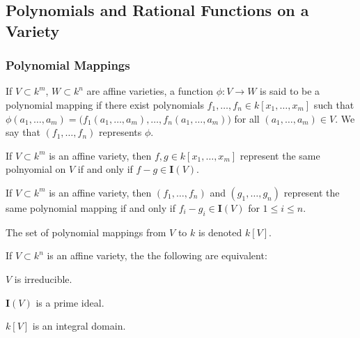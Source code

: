\documentclass[crop=false,class=book,oneside]{standalone}
\begin{document}
\subsection{Polynomials and Rational Functions on a Variety}
\subsubsection{Polynomial Mappings}
\begin{definition}
If $V\subset k^m$, $W\subset k^n$ are affine varieties, a function $\phi:V\rightarrow W$ is said to be a polynomial mapping if there exist polynomials $f_1,\hdots, f_n\in k[x_1,\hdots, x_m]$ such that $\phi(a_1,\hdots, a_m) = \big(f_1(a_1,\hdots, a_m),\hdots, f_n(a_1,\hdots, a_m)\big)$ for all $(a_1,\hdots, a_m) \in V$. We say that $(f_1,\hdots, f_n)$ represents $\phi$.
\end{definition}
\begin{theorem}
If $V\subset k^m$ is an affine variety, then $f,g\in k[x_1,\hdots, x_m]$ represent the same polnyomial on $V$ if and only if $f-g \in \textbf{I}(V)$.
\end{theorem}
\begin{theorem}
If $V\subset k^m$ is an affine variety, then $(f_1,\hdots, f_n)$ and $(g_1,\hdots, g_n)$ represent the same polynomial mapping if and only if $f_i-g_i \in \textbf{I}(V)$ for $1\leq i \leq n$.
\end{theorem}
\begin{notation}
The set of polynomial mappings from $V$ to $k$ is denoted $k[V]$.
\end{notation}
\begin{theorem}
If $V\subset k^n$ is an affine variety, the the following are equivalent:
\begin{enumerate}
\begin{multicols}{3}
    \item $V$ is irreducible.
    \item $\textbf{I}(V)$ is a prime ideal.
    \item $k[V]$ is an integral domain.
\end{multicols}
\end{enumerate}
\end{theorem}
\end{document}
